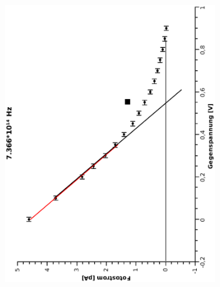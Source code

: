 \documentclass{article}
\begin{document}
\begin{figure}
\begin{subfigure}{0.45\textwidth}
\includegraphics[width=\textwidth, angle=-90]{7366.eps}
\end{subfigure}
\hfill	
\begin{subfigure}{0.45\textwidth}

\end{subfigure}
\end{figure}
\end{document}

